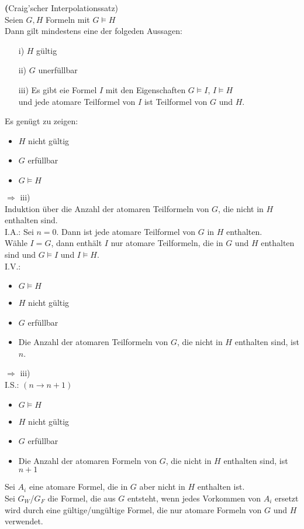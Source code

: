 

 \textbf(Craig'scher Interpolationssatz)\\
Seien $G,H$ Formeln mit $G \models H$\\
Dann gilt mindestens eine der folgeden Aussagen:\\
\begin{enumerate}
\item[i)] $H$ gültig
\item[ii)] $G$ unerfüllbar
\item[iii)] Es gibt eie Formel $I$ mit den Eigenschaften $G \models I$, $I \models H$\\
und jede atomare Teilformel von $I$ ist Teilformel von $G$ und $H$.
\end{enumerate}

\beweis{}
Es genügt zu zeigen:\\
\begin{itemize}
\item $H$ nicht gültig
\item $G$ erfüllbar
\item $G \models H$
\end{itemize}
$\Rightarrow$ iii)\\

\noindent
Induktion über die Anzahl der atomaren Teilformeln von $G$, die nicht in $H$ enthalten sind.\\

\noindent
I.A.: Sei $n=0$. Dann ist jede atomare Teilformel von $G$ in $H$ enthalten.\\
Wähle $I=G$, dann enthält $I$ nur atomare Teilformeln, die in $G$ und $H$ enthalten sind und $G \models I$ und $I \models H$.\\

\noindent
I.V.:
\begin{itemize}
\item $G \models H$ 
\item $H$ nicht gültig
\item $G$ erfüllbar
\item Die Anzahl der atomaren Teilformeln von $G$, die nicht in $H$ enthalten sind, ist $n$.
\end{itemize}
$\Rightarrow$ iii)\\

\noindent
I.S.: $(n \rightarrow n+1)$\\
\begin{itemize}
\item $G \models H$
\item $H$ nicht gültig
\item $G$ erfüllbar
\item Die Anzahl der atomaren Formeln von $G$, die nicht in $H$ enthalten sind, ist $n+1$
\end{itemize}
\noindent
Sei $A_i$ eine atomare Formel, die in $G$ aber nicht in $H$ enthalten ist.\\
Sei $G_W$/$G_F$ die Formel, die aus $G$ entsteht, wenn jedes Vorkommen von $A_i$ ersetzt wird durch eine gültige/ungültige Formel, die nur atomare Formeln von $G$ und $H$ verwendet.\\


